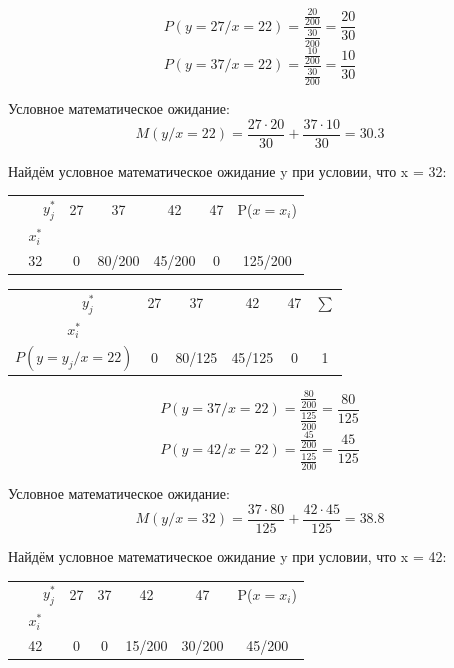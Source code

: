 \documentclass{article}
\begin{document}
\[P(y=27 / x = 22) = \frac{\frac{20}{200}}{\frac{30}{200}} = \frac{20}{30}\]
\[P(y=37 / x = 22) = \frac{\frac{10}{200}}{\frac{30}{200}} = \frac{10}{30}\]

Условное математическое ожидание:
\[M(y/x=22) = \frac{27\cdot 20}{30} + \frac{37\cdot 10}{30} = 30.3\]

Найдём условное математическое ожидание y при условии, что x = 32:

\begin{table}[H]
    \centering
    \begin{tabular}{|c|c|c|c|c|c|}
    \hline
     \ \ \ \ $y_j^*$&  27&  37&  42& 47& P($x=x_i$)\\
    $x_i^*$&  &  &  & &\\
    \hline
    32&  0&  80/200&  45/200& 0& 125/200\\
    \hline
    \end{tabular}
\end{table}

\begin{table}[H]
    \centering
    \begin{tabular}{|c|c|c|c|c|c|}
    \hline
     \ \ \ \ $y_j^*$&  27&  37&  42& 47 & $\sum$\\
    $x_i^*$&  &  &  & &\\
    \hline
    $P(y=y_j / x = 22)$&  0&  80/125&  45/125& 0& 1\\
    \hline
    \end{tabular}
\end{table}

\[P(y=37 / x = 22) = \frac{\frac{80}{200}}{\frac{125}{200}} = \frac{80}{125}\]
\[P(y=42 / x = 22) = \frac{\frac{45}{200}}{\frac{125}{200}} = \frac{45}{125}\]

Условное математическое ожидание:
\[M(y/x=32) = \frac{37\cdot 80}{125} + \frac{42\cdot 45}{125} = 38.8\]

Найдём условное математическое ожидание y при условии, что x = 42:

\begin{table}[H]
    \centering
    \begin{tabular}{|c|c|c|c|c|c|}
    \hline
     \ \ \ \ $y_j^*$&  27&  37&  42& 47& P($x=x_i$)\\
    $x_i^*$&  &  &  & &\\
    \hline
    42&  0&  0&  15/200& 30/200& 45/200\\
    \hline
    \end{tabular}
\end{table}
\end{document}
